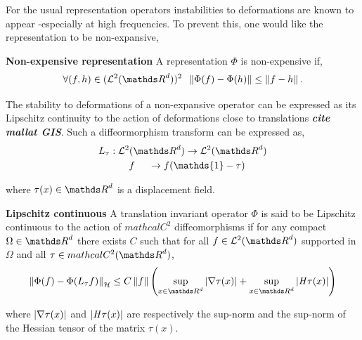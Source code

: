 \documentclass[a4paper,11pt]{report}
\begin{document}
      For the usual representation operators instabilities to deformations are known to appear -especially at high frequencies. To prevent this, one would like the representation to be non-expansive,
      
      \begin{defn} \textbf{Non-expensive representation}
				A representation $\Phi$ is non-expensive if,
				\begin{equation}
			  		\forall (f,h) \in (\mathcal{L}^{2}(\dsR^{d}))^{2} \;\; 
			  		\norm{\Phi(f) - \Phi(h)} \leq \norm{f-h}.
				\end{equation}
				\label{def:Non-expansivity - intuition}
      \end{defn}
      
      The stability to deformations of a non-expansive operator can be expressed as its Lipschitz continuity to the action of deformations close to translations \textbf{\textit{cite mallat GIS}}. Such a diffeormorphism transform can be expressed as,
      \begin{equation*}
      		\begin{split}
      			L_{\tau}	: \; & \mathcal{L}^{2}(\dsR^{d}) \rightarrow \mathcal{L}^{2}(\dsR^{d})\\
      							  & \;\;\;\; f \;\;\;\;\; \rightarrow  f(\mathds{1} - \tau)
				\end{split}
      \end{equation*}

			where $\tau(x) \in \dsR^{d}$ is a displacement field.
			
			\begin{prop} \textbf{Lipschitz continuous}
				A translation invariant operator $\Phi$ is said to be Lipschitz continuous to the action of $mathcal{C}^{2}$ diffeomorphisms if for any compact $\Omega \in \dsR^{d}$ there exists $C$ such that for all $f \in \mathcal{L}^{2}(\dsR^{d})$ supported in $\Omega$ and all $\tau \in mathcal{C}^{2}(\dsR^{d})$,
				\begin{equation}
					\norm{\Phi(f) - \Phi(L_{\tau}f)}_{\mathcal{H}} \leq 
					C \norm{f} \left(\sup_{x \in \dsR^{d}} \abs{\nabla \tau(x)} + \sup_{x \in \dsR^{d}} \abs{\mathit{H}\tau(x)}\right)
					\label{eq:Lipschitz continuity}
				\end{equation}
				\label{pty:Lipschitz continuity - intuition}
			\end{prop}
      
      where $\left| \nabla \tau(x) \right|$ and $\left| \mathit{H}\tau(x) \right|$ are respectively the sup-norm and the sup-norm of the Hessian tensor of the matrix $\tau(x)$.\\
      
\end{document}
